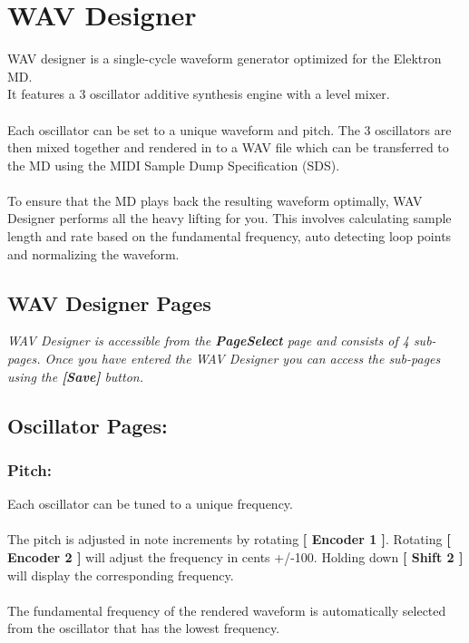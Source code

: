 \chapter{WAV Designer}
WAV designer is a single-cycle waveform generator optimized for the Elektron MD.\\
It features a 3 oscillator additive synthesis engine with a level mixer.\\
\\
Each oscillator can be set to a unique waveform and pitch. The 3 oscillators are then mixed together and rendered in to a WAV file which can be transferred to the MD using the MIDI Sample Dump Specification (SDS).\\
\\
To ensure that the MD plays back the resulting waveform optimally, WAV Designer performs all the heavy lifting for you. This involves calculating sample length and rate based on the fundamental frequency, auto detecting loop points and normalizing the waveform.
\section{WAV Designer Pages}
\textit{WAV Designer is accessible from the \textbf{PageSelect} page and consists of 4 sub-pages. Once you have entered the WAV Designer you can access the sub-pages using the \textbf{[Save]} button.}

\section{Oscillator Pages:}


\subsection{Pitch:}
Each oscillator can be tuned to a unique frequency.\\
\\The pitch is adjusted in note increments by rotating \textbf{[ Encoder 1 ]}. Rotating \textbf{[ Encoder 2 ]} will adjust the frequency in cents +/-100. Holding down \textbf{[ Shift 2 ]} will display the corresponding frequency.\\
\\The fundamental frequency of the rendered waveform is automatically selected from the oscillator that has the lowest frequency.
